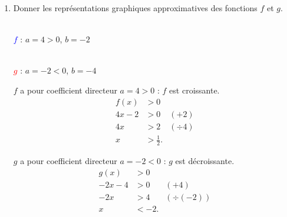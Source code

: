 \documentclass[10pt,a4paper]{article}
\begin{document}
\begin{enumerate}
\item Donner les représentations graphiques approximatives des fonctions \(f\) et \(g\).

\begin{center}
\begin{minipage}{2.6cm}
\centering
{}\\[2pt]
{\scriptsize \textcolor{blue}{\(f\)} : \(a=4>0\), \(b=-2\)}
\end{minipage}
\hspace{0.3cm}
\begin{minipage}{2.6cm}
\centering
{}\\[2pt]
{\scriptsize \textcolor{red}{\(g\)} : \(a=-2<0\), \(b=-4\)}
\end{minipage}
\end{center}

\begin{center}
\begin{minipage}{0.48\linewidth}
\(f\) a pour coefficient directeur \(a=4>0\) : \(f\) est croissante.
\[
\begin{aligned}
f(x)&>0\\
4x-2&>0 &\scriptstyle(+2)\\
4x&>2 &\scriptstyle(\div 4)\\
x&>\frac{1}{2}.
\end{aligned}
\]
\end{minipage}
\hfill
\begin{minipage}{0.48\linewidth}
\(g\) a pour coefficient directeur \(a=-2<0\) : \(g\) est décroissante.
\[
\begin{aligned}
g(x)&>0\\
-2x-4&>0 &\scriptstyle(+4)\\
-2x&>4 &\scriptstyle(\div(-2))\\
x&<-2.
\end{aligned}
\]
\end{minipage}
\end{center}


\end{enumerate}
\end{document}
